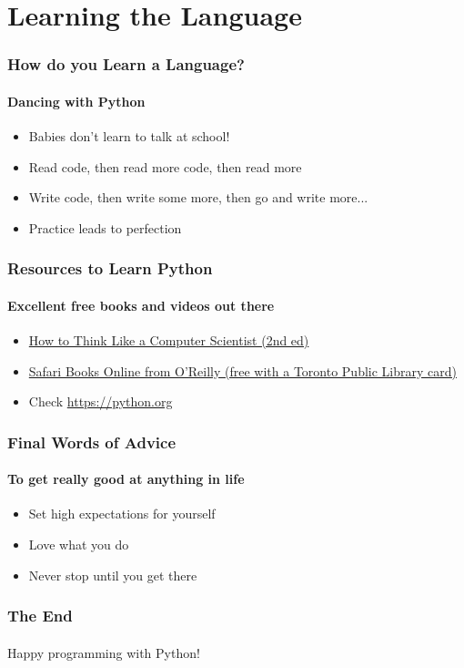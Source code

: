 \documentclass{beamer}
\begin{document}
\section[Section]{Learning the Language}
	\begin{frame}
	\frametitle{How do you Learn a Language?}
	\framesubtitle{Dancing with Python}
	\begin{itemize}
		\item Babies don't learn to talk at school!
		\item Read code, then read more code, then read more
		\item Write code, then write some more, then go and write more...
		\item Practice leads to perfection
	\end{itemize}
	\end{frame}

	\begin{frame}
	\frametitle{Resources to Learn Python}
	\framesubtitle{Excellent free books and videos out there}
	\begin{itemize}
		\item \href{http://www.openbookproject.net/thinkcs/python/english2e/}{How to Think Like a Computer Scientist (2nd ed)}
		\item \href{https://www.safaribooksonline.com}{Safari Books Online from O'Reilly (free with a Toronto Public Library card)}
		\item Check \url{https://python.org}
	\end{itemize}
	\end{frame}


	\begin{frame}
	\frametitle{Final Words of Advice}
	\framesubtitle{To get really good at anything in life}
	\begin{itemize}
		\item Set high expectations for yourself
		\item Love what you do
		\item Never stop until you get there
	\end{itemize}
	\end{frame}

	\begin{frame}
	\frametitle{The End}
	\framesubtitle{}
	\centering
	Happy programming with Python!
	\end{frame}
\end{document}
